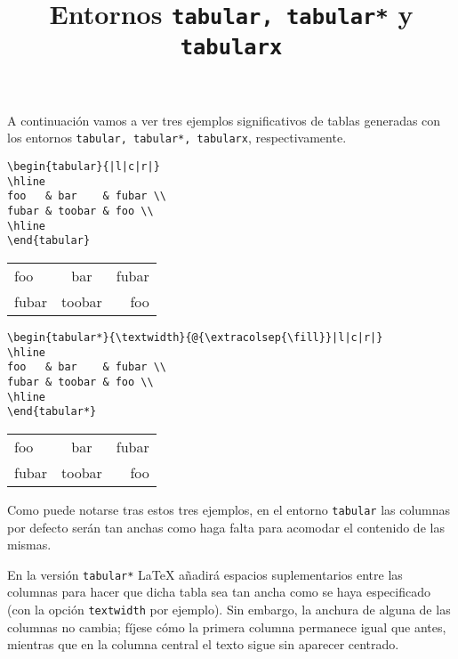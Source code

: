 \documentclass{article}
\title{Entornos {\tt tabular, tabular*} y {\tt tabularx}}
\begin{document}
	
\maketitle

	A continuación vamos a ver tres ejemplos significativos de tablas generadas con los entornos {\tt tabular, tabular*, tabularx}, respectivamente.
	
\vspace{1cm}

\begin{verbatim}
\begin{tabular}{|l|c|r|}
\hline
foo   & bar    & fubar \\
fubar & toobar & foo \\
\hline
\end{tabular}
\end{verbatim}

\begin{tabular}{|l|c|r|}
  \hline
  foo   & bar    & fubar \\
  fubar & toobar & foo \\
  \hline
\end{tabular}

\vspace{1cm}

\begin{verbatim}
\begin{tabular*}{\textwidth}{@{\extracolsep{\fill}}|l|c|r|}
\hline
foo   & bar    & fubar \\
fubar & toobar & foo \\
\hline
\end{tabular*}
\end{verbatim}

\begin{tabular*}{\textwidth}{@{\extracolsep{\fill}}|l|c|r|}
  \hline
  foo   & bar    & fubar \\
  fubar & toobar & foo \\
  \hline
\end{tabular*}

\vspace{1cm}


Como puede notarse tras estos tres ejemplos, en el entorno {\tt tabular} las columnas por defecto serán tan anchas como haga falta para acomodar el contenido de las mismas.

En la versión {\tt tabular*} \LaTeX{} añadirá espacios suplementarios entre las columnas para hacer que dicha tabla sea tan ancha como se haya especificado (con la opción {\tt textwidth} por ejemplo). Sin embargo, la anchura de alguna de las columnas no cambia; fíjese cómo la primera columna permanece igual que antes, mientras que en la columna central el texto sigue sin aparecer centrado.
\end{document}

